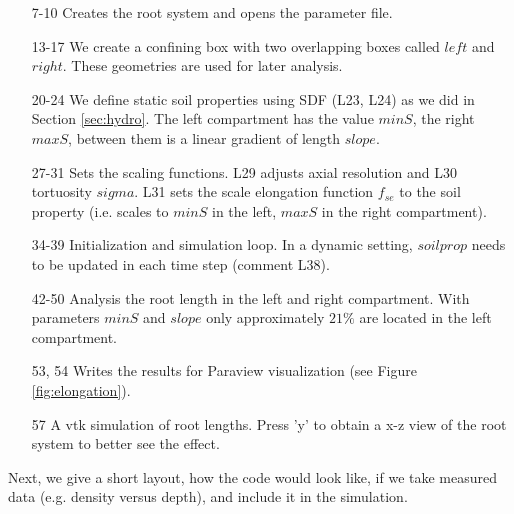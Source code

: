 \begin{itemize}

\item[7-10] Creates the root system and opens the parameter file.

\item[13-17] We create a confining box with two overlapping boxes called $left$ and $right$. These geometries are used for later analysis.

\item[20-24] We define static soil properties using SDF (L23, L24) as we did in Section \ref{sec:hydro}. 
The left compartment has the value $minS$, the right $maxS$, between them is a linear gradient of length $slope$. 

\item[27-31] Sets the scaling functions. L29 adjusts axial resolution and L30 tortuosity $sigma$. L31 sets the scale elongation function $f_{se}$ to the soil property (i.e. scales to $minS$ in the left, $maxS$ in the right compartment). 

\item[34-39] Initialization and simulation loop. In a dynamic setting, $soilprop$ needs to be updated in each time step (comment L38).

\item[42-50] Analysis the root length in the left and right compartment. With parameters $minS$ and $slope$ only approximately $21\%$ are located in the left compartment.

\item[53, 54] Writes the results for Paraview visualization (see Figure \ref{fig:elongation}).

\item[57] A vtk simulation of root lengths. Press 'y' to obtain a x-z view of the root system to better see the effect. 

\end{itemize}
 
Next, we give a short layout, how the code would look like, if we take measured data (e.g. density versus depth), and include it in the simulation. 




